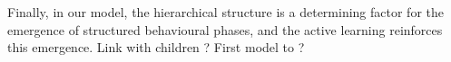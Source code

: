 \documentclass[10pt,letterpaper]{article}
\begin{document}
	
	Finally, in our model, the hierarchical structure is a determining factor for the emergence of structured behavioural phases, and the active learning reinforces this emergence.
	Link with children ?
	First model to ?
	
%






\setlength{\bibleftmargin}{.125in}
\setlength{\bibindent}{-\bibleftmargin}


\end{document}
